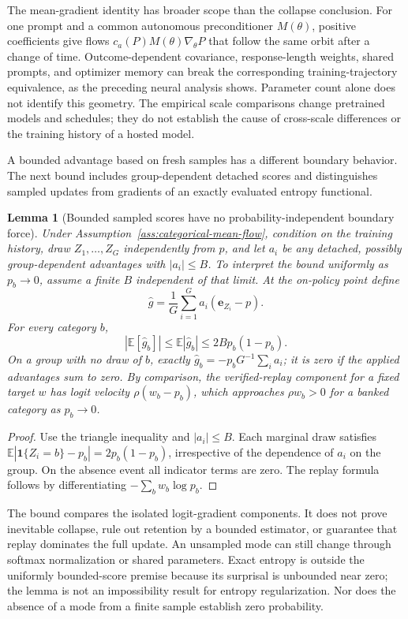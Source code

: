 \documentclass{article}
\newcommand{\enforcehalffinalproseline}{%
  \setlength{\parfillskip}{0pt plus .20\linewidth}}
\newcommand{\1}{\mathbf 1}
\newcommand{\E}{\mathbb E}
\newtheorem{lemma}{Lemma}[section]
\theoremstyle{remark}
\theoremstyle{definition}
\theoremstyle{plain}
\begin{document}
The mean-gradient identity has broader scope than the collapse conclusion.
For one prompt and a common autonomous preconditioner $M(\theta)$, positive
coefficients give flows $c_a(P)M(\theta)\nabla_\theta P$ that follow the same
orbit after a change of time. Outcome-dependent covariance, response-length
weights, shared prompts, and optimizer memory can break the corresponding
training-trajectory equivalence, as the preceding neural analysis shows.
Parameter count alone does not identify this geometry. The empirical scale
comparisons change pretrained models and schedules; they do not establish
the cause of cross-scale differences or the training history of a hosted
model.

A bounded advantage based on fresh samples has a different boundary behavior.
The next bound includes group-dependent detached scores and distinguishes
sampled updates from gradients of an exactly evaluated entropy functional.

\begin{lemma}[Bounded sampled scores have no probability-independent boundary force]
\enforcehalffinalproseline
\label{lem:sampled-score-bound}
Under Assumption~\ref{ass:categorical-mean-flow}, condition on the training history, draw
$Z_1,\ldots,Z_G$ independently from $p$, and let $a_i$ be any detached,
possibly group-dependent advantages with $|a_i|\le B$. To interpret the
bound uniformly as $p_b\to0$, assume a finite $B$ independent of that limit.
At the on-policy point define
\[
 \widehat g=\frac1G\sum_{i=1}^G a_i(\mathbf e_{Z_i}-p).
\]
For every category $b$,
\[
 |\E[\widehat g_b]|\le\E|\widehat g_b|
 \le 2B p_b(1-p_b).
\]
On a group with no draw of $b$, exactly
$\widehat g_b=-p_bG^{-1}\sum_i a_i$; it is zero if the applied advantages
sum to zero. By comparison, the verified-replay component for a fixed target
$w$ has logit velocity $\rho(w_b-p_b)$, which approaches $\rho w_b>0$
for a banked category as $p_b\to0$.
\end{lemma}

\begin{proof}
\enforcehalffinalproseline
Use the triangle inequality and $|a_i|\le B$. Each marginal draw satisfies
$\E|\1\{Z_i=b\}-p_b|=2p_b(1-p_b)$, irrespective of the dependence of
$a_i$ on the group. On the absence event all indicator terms are zero.
The replay formula follows by differentiating $-\sum_b w_b\log p_b$.
\end{proof}

The bound compares the isolated logit-gradient components. It does not prove
inevitable collapse, rule out retention by a bounded estimator, or guarantee
that replay dominates the full update. An unsampled mode can still change
through softmax normalization or shared parameters. Exact entropy is outside
the uniformly bounded-score premise because its surprisal is unbounded near
zero; the lemma is not an impossibility result for entropy regularization.
Nor does the absence of a mode from a finite sample establish zero probability.
\end{document}
